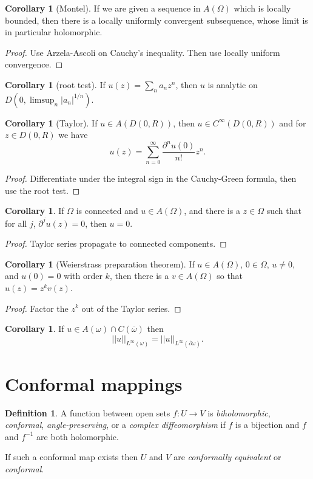 \documentclass[12pt]{report}
\theoremstyle{definition}
\newtheorem{corollary}[theorem]{Corollary}
\newtheorem{definition}[theorem]{Definition}
\begin{document}
\begin{corollary}[Montel]
    If we are given a sequence in $A(\Omega)$ which is locally bounded, then there is a locally uniformly convergent subsequence, whose limit is in particular holomorphic.
\end{corollary}
\begin{proof}
    Use Arzela-Ascoli on Cauchy's inequality. Then use locally uniform convergence.
\end{proof}
\begin{corollary}[root test]
    If $u(z) = \sum_n a_nz^n$, then $u$ is analytic on $D(0, \limsup_n |a_n|^{1/n})$.
\end{corollary}
\begin{corollary}[Taylor]
    If $u \in A(D(0, R))$, then $u \in C^\infty(D(0, R))$ and for $z \in D(0, R)$ we have
    $$u(z) = \sum_{n=0}^\infty \frac{\partial^n u(0)}{n!} z^n.$$
\end{corollary}
\begin{proof}
    Differentiate under the integral sign in the Cauchy-Green formula, then use the root test.
\end{proof}
\begin{corollary}
    If $\Omega$ is connected and $u \in A(\Omega)$, and there is a $z \in \Omega$ such that for all $j$, $\partial^ju(z) = 0$, then $u = 0$.
\end{corollary}
\begin{proof}
    Taylor series propagate to connected components.
\end{proof}
\begin{corollary}[Weierstrass preparation theorem]
    If $u \in A(\Omega)$, $0 \in \Omega$, $u \neq 0$, and $u(0) = 0$ with order $k$, then there is a $v \in A(\Omega)$ so that $u(z) = z^k v(z)$.
\end{corollary}
\begin{proof}
    Factor the $z^k$ out of the Taylor series.
\end{proof}
\begin{corollary}
    If $u \in A(\omega) \cap C(\overline \omega)$ then
    $$||u||_{L^\infty(\omega)} = ||u||_{L^\infty(\partial \omega)}.$$
\end{corollary}

\section{Conformal mappings}
\begin{definition}
A function between open sets $f: U \to V$ is \emph{biholomorphic}, \emph{conformal}, \emph{angle-preserving}, or a \emph{complex diffeomorphism} if $f$ is a bijection and $f$ and $f^{-1}$ are both holomorphic.

If such a conformal map exists then $U$ and $V$ are \emph{conformally equivalent} or \emph{conformal}.
\end{definition}
\end{document}
